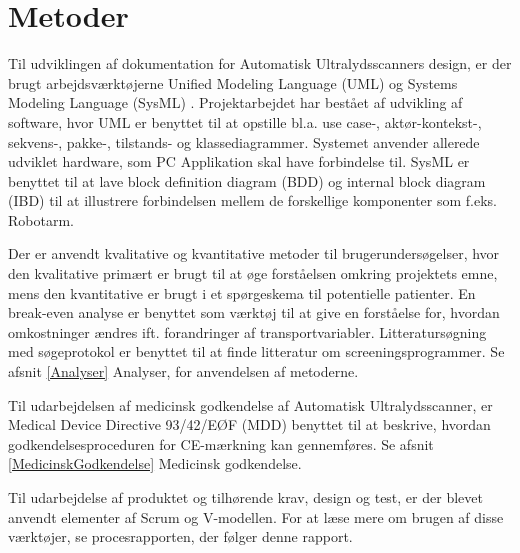 \chapter{Metoder}\label{Metoder}

Til udviklingen af dokumentation for Automatisk Ultralydsscanners design, er der brugt arbejdsværktøjerne Unified Modeling Language (UML) \cite{UML}  og Systems Modeling Language (SysML) \cite{SysML}. Projektarbejdet har bestået af udvikling af software, hvor UML er benyttet til at opstille bl.a. use case-, aktør-kontekst-, sekvens-, pakke-, tilstands- og klassediagrammer. Systemet anvender allerede udviklet hardware, som PC Applikation skal have forbindelse til. SysML er benyttet til at lave block definition diagram (BDD) og internal block diagram (IBD) til at illustrere forbindelsen mellem de forskellige komponenter som f.eks. Robotarm.

Der er anvendt kvalitative og kvantitative metoder \cite{MetoderBruger} til brugerundersøgelser, hvor den kvalitative primært er brugt til at øge forståelsen omkring projektets emne, mens den kvantitative er brugt i et spørgeskema til potentielle patienter. En break-even analyse \cite{Erhvervsokonomi} er benyttet som værktøj til at give en forståelse for, hvordan omkostninger ændres ift. forandringer af transportvariabler. Litteratursøgning med søgeprotokol er benyttet til at finde litteratur om screeningsprogrammer. Se afsnit \ref{Analyser} Analyser, for anvendelsen af metoderne. 

Til udarbejdelsen af medicinsk godkendelse af Automatisk Ultralydsscanner, er Medical Device Directive 93/42/EØF (MDD)\cite{MDD} benyttet til at beskrive, hvordan godkendelsesproceduren for CE-mærkning kan gennemføres. Se afsnit \ref{MedicinskGodkendelse} Medicinsk godkendelse.

Til udarbejdelse af produktet og tilhørende krav, design og test, er der blevet anvendt elementer af Scrum og V-modellen. For at læse mere om brugen af disse værktøjer, se procesrapporten, der følger denne rapport.

